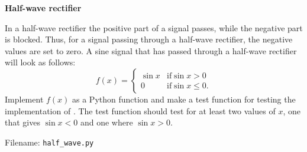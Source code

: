 \begin{Problem}{\textbf{Half-wave rectifier}} \label{prob34}

\noindent In a half-wave rectifier the positive part of a signal passes, while the negative
part is blocked. Thus, for a signal passing through a half-wave rectifier,
the negative values are set to zero.
A sine signal that has passed through a half-wave rectifier will look as follows:
\begin{equation*}
f(x) = \begin{cases}
      \sin x & \mathrm{if} \sin x > 0 \\
      0 & \mathrm{if} \sin x \leq 0.
   \end{cases}
\end{equation*}
Implement $f(x)$ as a Python function  and make a test function
for testing the implementation of . The test function should test
for at least two values of $x$, one that gives $\sin x <0$ and one where $\sin x >0$.

Filename: \texttt{half\_wave.py}
\end{Problem}

